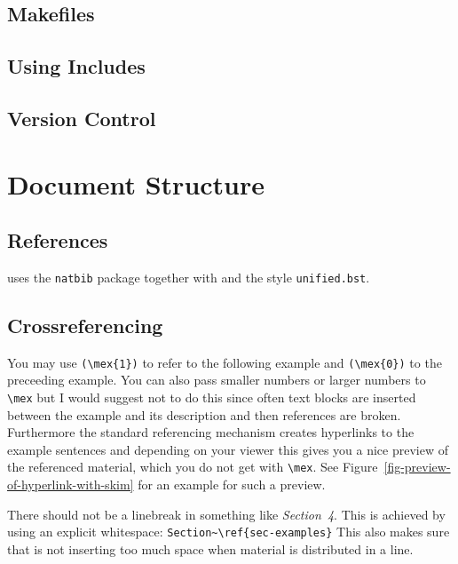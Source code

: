 \subsection{Makefiles}

\subsection{Using Includes}

\subsection{Version Control}


\section{Document Structure}




\subsection{References}

\lsp uses the \texttt{natbib} package together with \bibtex and the \bibtex style \texttt{unified.bst}.

\subsection{Crossreferencing}

You may use \verb+(\mex{1})+ to refer to the following example and \verb+(\mex{0})+ to the preceeding
example. You can also pass smaller numbers or larger numbers to \verb+\mex+ but I would suggest not
to do this since often text blocks are inserted between the example and its description and then
references are broken. Furthermore the standard referencing mechanism creates hyperlinks to the
example sentences and depending on your viewer this gives you a nice preview of the referenced
material, which you do not get with \verb+\mex+. See Figure~\vref{fig-preview-of-hyperlink-with-skim} for an example for such a preview.
\begin{figure}[htbp]
\caption{\label{fig-preview-of-hyperlink-with-skim}}
\end{figure}


There should not be a linebreak in something like \emph{Section~4}. This is achieved by using an explicit
whitespace: \verb+Section~\ref{sec-examples}+ This also makes sure that \latex is not inserting too
much space when material is distributed in a line.

